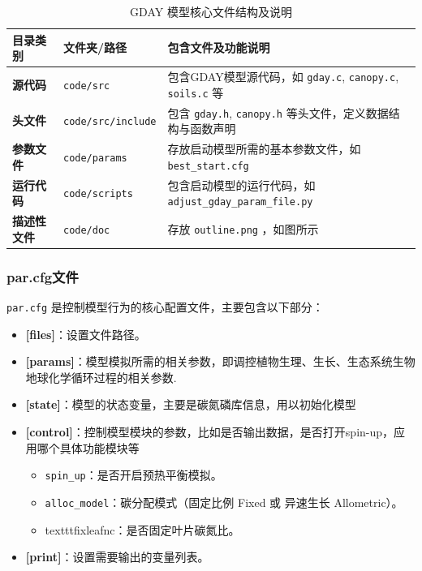 \documentclass[10pt]{config}
\begin{document}
\begin{table}[h]
    \centering
    \caption{GDAY 模型核心文件结构及说明}
    \small
    \renewcommand{\arraystretch}{1.2}
    \begin{tabular}{p{} p{} p{}}
        \toprule
        \textbf{目录类别} & \textbf{文件夹/路径} & \textbf{包含文件及功能说明} \\
        \midrule
        \textbf{源代码} & \texttt{code/src} & 包含GDAY模型源代码，如 \texttt{gday.c}, \texttt{canopy.c}, \texttt{soils.c} 等 \\
        \textbf{头文件} & \texttt{code/src/include} & 包含 \texttt{gday.h}, \texttt{canopy.h} 等头文件，定义数据结构与函数声明 \\
        \textbf{参数文件} & \texttt{code/params} & 存放启动模型所需的基本参数文件，如\texttt{best\_start.cfg} \\
        \textbf{运行代码} & \texttt{code/scripts} & 包含启动模型的运行代码，如\texttt{adjust\_gday\_param\_file.py} \\
        \textbf{描述性文件} & \texttt{code/doc} & 存放 \texttt{outline.png} ，如图\label{fig:gday_structure}所示 \\
        \bottomrule
    \end{tabular}
    \label{tab:model_file_structure}
\end{table}


\subsubsection{par.cfg文件}
\texttt{par.cfg} 是控制模型行为的核心配置文件，主要包含以下部分：
\begin{itemize}
    \item \textbf{[files]}：设置文件路径。
    \item \textbf{[params]}：模型模拟所需的相关参数，即调控植物生理、生长、生态系统生物地球化学循环过程的相关参数.
    \item \textbf{[state]}：模型的状态变量，主要是碳氮磷库信息，用以初始化模型
    \item \textbf{[control]}：控制模型模块的参数，比如是否输出数据，是否打开spin-up，应用哪个具体功能模块等
    \begin{itemize}
        \item \texttt{spin\_up}：是否开启预热平衡模拟。
        \item \texttt{alloc\_model}：碳分配模式（固定比例 Fixed 或 异速生长 Allometric）。
      \item texttt{fixleafnc}：是否固定叶片碳氮比。
    \end{itemize}
    \item \textbf{[print]}：设置需要输出的变量列表。
\end{itemize}
\end{document}
